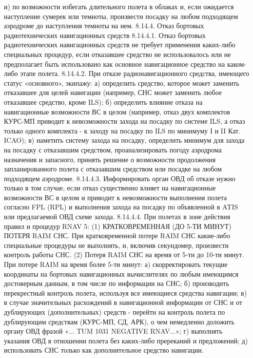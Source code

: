 и)	по возможности избегать длительного полета в облаках и, если ожидается наступление сумерек или темноты, произвести посадку на любом подходящем аэродроме до наступления темноты на нем.
8.14.4.	Отказ бортовых радиотехнических навигационных средств
8.14.4.1. Отказ бортовых радиотехнических навигационных средств не требует применения каких-либо специальных процедур, если отказавшее средство не использовалось или не предполагает быть использовано как основное навигационное средство на каком-либо этапе полета.
8.14.4.2. При отказе радионавигационного средства, имеющего статус «основного», экипажу:
а)	определить средство, которое может заменить отказавшее для целей навигации (например, СНС может заменить любое отказавшее средство, кроме ILS);
б)	определить влияние отказа на навигационные возможности ВС в целом (например, отказ двух комплектов КУРС-МП приводит к невозможности захода на посадку по системе ILS, а отказ только одного комплекта - к заходу на посадку по ILS по минимуму I и II Кат. ICAO);
в)	наметить систему захода на посадку, определить минимум для захода на посадку с отказавшим средством, проанализировать погоду аэродрома назначения и запасного, принять решение о возможности продолжения запланированного полета с отказавшим средством или посадке на любом подходящем аэродроме.
8.14.4.3. Информировать орган ОВД об отказе нужно только в том случае, если отказ существенно влияет на навигационные возможности ВС в целом и приводит к невозможности выполнения полета согласно FPL (RPL) и выполнения захода на посадку по объявленной в ATIS или предлагаемой ОВД схеме захода.
8.14.4.4.	При полетах в зоне действия правил и процедур RNAV 5:
(1) КРАТКОВРЕМЕННАЯ (ДО 5-ТИ МИНУТ) ПОТЕРЯ RAIM СНС.
При кратковременной потере RAIM СНС какие-либо специальные процедуры не выполнять, и, включив секундомер, произвести контроль работы СНС. 
(2) Потеря RAIM СНС на время от 5-ти до 10-ти минут.
При потере RAIM на время более 5-ти минут:
а)	скорректировать текущие координаты на бортовых навигационных вычислителях по любым имеющимся достоверным данным, в том числе по информации на СНС;
б)	производить перекрестный контроль полета, используя все имеющиеся средства навигации;
в)	в случае значительных расхождений в навигационной информации от СНС и от дублирующих (дополнительных) средств - перейти на контроль полета по дублирующим средствам (КУРС-МП, СД, АРК), о чем немедленно доложить органу ОВД фразой «... TUM 1031 NEGATIVE RNAV...»;
г)	выполнять указания ОВД в отношении полета без каких-либо пререканий и предложений;
д)	использовать СНС только как дополнительное средство навигации. 
